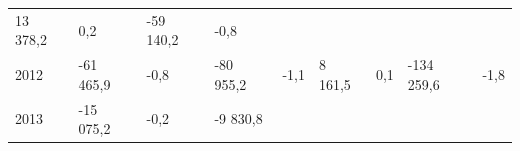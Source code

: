 \begin{longtable}[]{@{}lllllllll@{}}
\begin{minipage}[t]{0.12\columnwidth}
13 378,2\strut
\end{minipage} & \begin{minipage}[t]{0.06\columnwidth}\raggedright
0,2\strut
\end{minipage} & \begin{minipage}[t]{0.09\columnwidth}\raggedright
-59 140,2\strut
\end{minipage} & \begin{minipage}[t]{0.06\columnwidth}\raggedright
-0,8\strut
\end{minipage}\tabularnewline
\begin{minipage}[t]{0.05\columnwidth}\raggedright
2012\strut
\end{minipage} & \begin{minipage}[t]{0.10\columnwidth}\raggedright
-61 465,9\strut
\end{minipage} & \begin{minipage}[t]{0.06\columnwidth}\raggedright
-0,8\strut
\end{minipage} & \begin{minipage}[t]{0.16\columnwidth}\raggedright
-80 955,2\strut
\end{minipage} & \begin{minipage}[t]{0.06\columnwidth}\raggedright
-1,1\strut
\end{minipage} & \begin{minipage}[t]{0.12\columnwidth}\raggedright
8 161,5\strut
\end{minipage} & \begin{minipage}[t]{0.06\columnwidth}\raggedright
0,1\strut
\end{minipage} & \begin{minipage}[t]{0.09\columnwidth}\raggedright
-134 259,6\strut
\end{minipage} & \begin{minipage}[t]{0.06\columnwidth}\raggedright
-1,8\strut
\end{minipage}\tabularnewline
\begin{minipage}[t]{0.05\columnwidth}\raggedright
2013\strut
\end{minipage} & \begin{minipage}[t]{0.10\columnwidth}\raggedright
-15 075,2\strut
\end{minipage} & \begin{minipage}[t]{0.06\columnwidth}\raggedright
-0,2\strut
\end{minipage} & \begin{minipage}[t]{0.16\columnwidth}\raggedright
-9 830,8\strut

\end{minipage}
\end{longtable}

